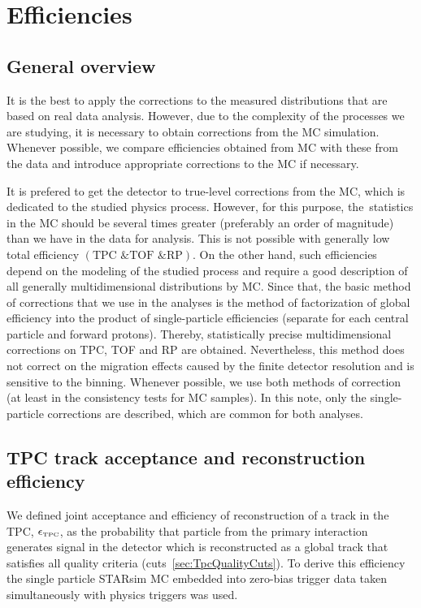 

\chapter{Efficiencies}\label{chap:efficiencies}
\section{General overview}\label{sec:effGeneralOverview}
It is the best to apply the corrections to the measured distributions  that are based on real data analysis. However, due to the complexity of the processes we are studying, it is necessary to obtain corrections from the MC simulation. Whenever possible, we compare efficiencies obtained from MC with these from the data and introduce appropriate corrections to the MC if necessary.

It is prefered to get the detector to true-level corrections from the MC, which is dedicated to the studied physics process. However, for this purpose, the~statistics in the MC should be several times greater (preferably an order of magnitude) than we have in the data for analysis. This is not possible with generally low total efficiency $\left(\textrm{TPC \& TOF \& RP}\right)$. On the other hand, such efficiencies depend on the modeling of the studied process and require a good description of all generally multidimensional distributions  by MC. Since that, the basic method of corrections that we use in the analyses is the method of factorization of global efficiency into the product of single-particle efficiencies (separate for each central particle and forward protons). Thereby,  statistically precise multidimensional corrections on TPC, TOF and RP are obtained. Nevertheless, this method does not correct on the migration effects caused by the finite detector resolution and is sensitive to the binning. Whenever possible, we use both methods of correction (at least in the consistency tests for MC samples). In this note, only the single-particle corrections are described, which are common for both analyses.

\section{TPC track acceptance and reconstruction efficiency}\label{sec:tpcAccAndEff}
We defined joint acceptance and efficiency of reconstruction of a track in the TPC, $\epsilon_{\textrm{\tiny TPC}}$, as the probability that particle from the primary interaction generates signal in the detector which is reconstructed as a global track that satisfies all quality criteria (cuts~\ref{sec:TpcQualityCuts}).
To derive this efficiency the single particle STARsim MC embedded into zero-bias trigger data taken simultaneously with physics triggers 
 was used.
